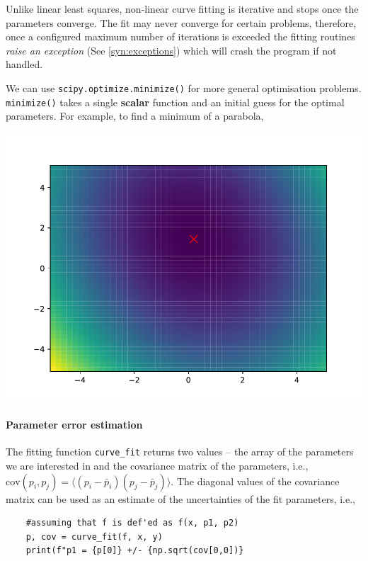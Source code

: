 \documentclass{article}
\newcommand{\ls}[1]{\lstinline{#1}}
\begin{document}
Unlike linear least squares, non-linear curve fitting is iterative and stops once the parameters converge. The fit may never converge for certain problems, therefore, once a configured maximum number of iterations is exceeded the fitting routines \emph{raise an exception} (See \ref{syn:exceptions}) which will crash the program if not handled.

We can use \ls{scipy.optimize.minimize()} for more general optimisation problems. \ls{minimize()} takes a single \textbf{scalar} function and an initial guess for the optimal parameters. For example, to find a minimum of a parabola,

\begin{center}
    \includegraphics[width=0.5\linewidth]{parabola-minimize.pdf}
\end{center}

\paragraph{Parameter error estimation} The fitting function \ls{curve_fit} returns two values -- the array of the parameters we are interested in and the covariance matrix of the parameters, i.e., $\mathrm{cov}(p_i, p_j) = \langle(p_i - \bar p_i)(p_j - \bar p_j)\rangle$. The diagonal values of the covariance matrix can be used as an estimate of the uncertainties of the fit parameters, i.e.,
\begin{lstlisting}
    #assuming that f is def'ed as f(x, p1, p2)
    p, cov = curve_fit(f, x, y)
    print(f"p1 = {p[0]} +/- {np.sqrt(cov[0,0])}
\end{lstlisting}
\end{document}
